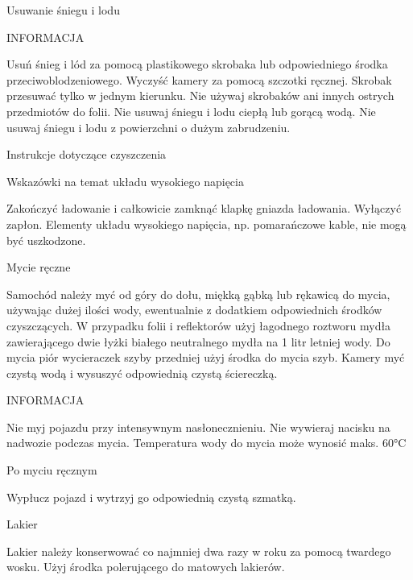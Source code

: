 Usuwanie śniegu i lodu

INFORMACJA
\begin{itemizeTriangle}
	\itemTriangle Usuń śnieg i lód za pomocą plastikowego skrobaka lub odpowiedniego środka przeciwoblodzeniowego.
	\itemTriangle Wyczyść kamery za pomocą szczotki ręcznej.
	\itemTriangle Skrobak przesuwać tylko w jednym kierunku.
	\itemTriangle Nie używaj skrobaków ani innych ostrych przedmiotów do folii.
	\itemTriangle Nie usuwaj śniegu i lodu ciepłą lub gorącą wodą.
	\itemTriangle Nie usuwaj śniegu i lodu z powierzchni o dużym zabrudzeniu.
\end{itemizeTriangle}

Instrukcje dotyczące czyszczenia

Wskazówki na temat układu wysokiego napięcia

\begin{itemizeArrow}
	\itemArrow Zakończyć ładowanie i całkowicie zamknąć klapkę gniazda ładowania.
	\itemArrow Wyłączyć zapłon.
	\itemArrow Elementy układu wysokiego napięcia, np. pomarańczowe kable, nie mogą być uszkodzone.
\end{itemizeArrow}

Mycie ręczne

\begin{itemizeArrow}
	\itemArrow Samochód należy myć od góry do dołu, miękką gąbką lub rękawicą do mycia, używając dużej ilości wody, ewentualnie z dodatkiem odpowiednich środków czyszczących.
	\itemArrow W przypadku folii i reflektorów użyj łagodnego roztworu mydła zawierającego dwie łyżki białego neutralnego mydła na 1 litr letniej wody.
	\itemArrow Do mycia piór wycieraczek szyby przedniej użyj środka do mycia szyb.
	\itemArrow Kamery myć czystą wodą i wysuszyć odpowiednią czystą ściereczką.
\end{itemizeArrow}

INFORMACJA
\begin{itemizeTriangle}
	\itemTriangle Nie myj pojazdu przy intensywnym nasłonecznieniu.
	\itemTriangle Nie wywieraj nacisku na nadwozie podczas mycia.
	\itemTriangle Temperatura wody do mycia może wynosić maks. 60°C
\end{itemizeTriangle}

Po myciu ręcznym
\begin{itemizeArrow}
	\itemArrow Wypłucz pojazd i wytrzyj go odpowiednią czystą szmatką.
\end{itemizeArrow}

Lakier
\begin{itemizeArrow}
	\itemArrow Lakier należy konserwować co najmniej dwa razy w roku za pomocą twardego wosku.
	\itemArrow Użyj środka polerującego do matowych lakierów.
\end{itemizeArrow}

